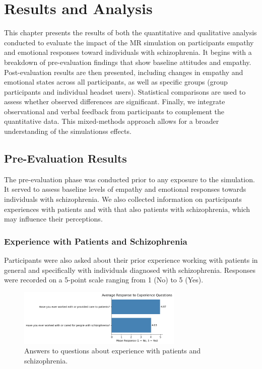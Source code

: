 \chapter{Results and Analysis}
\label{ch:resultsandanalysis}

This chapter presents the results of both the quantitative and qualitative analysis conducted to evaluate the impact of the MR simulation on participants empathy and emotional responses toward individuals with schizophrenia. It begins with a breakdown of pre-evaluation findings that show baseline attitudes and empathy. Post-evaluation results are then presented, including changes in empathy and emotional states across all participants, as well as specific groups (group participants and individual headset users). Statistical comparisons are used to assess whether observed differences are significant. Finally, we integrate observational and verbal feedback from participants to complement the quantitative data. This mixed-methods approach allows for a broader understanding of the simulationss effects.

\section{Pre-Evaluation Results}
The pre-evaluation phase was conducted prior to any exposure to the simulation. It served to assess baseline levels of empathy and emotional responses towards individuals with schizophrenia. We also collected information on participants experiences with patients and with that also patients with schizophrenia, which may influence their perceptions.

\subsection{Experience with Patients and Schizophrenia}

Participants were also asked about their prior experience working with patients in general and specifically with individuals diagnosed with schizophrenia. Responses were recorded on a 5-point scale ranging from 1 (No) to 5 (Yes).


\begin{figure}[H]
    \centering
    \includegraphics[width=0.7\textwidth]{../../Figures/experience-patients.png}
    \caption{Answers to questions about experience with patients and schizophrenia.}
    \label{fig:experience_patients}
\end{figure}

